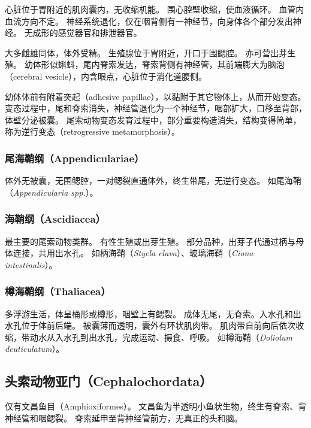 \documentclass[11pt]{article}
\begin{document}
\newline

心脏位于胃附近的肌肉囊内，无收缩机能。
围心腔壁收缩，使血液循环。
血管内血流方向不定。
神经系统退化，仅在咽背侧有一神经节，向身体各个部分发出神经。
无成形的感觉器官和排泄器官。

\newline

大多雌雄同体，体外受精。
生殖腺位于胃附近，开口于围鳃腔。
亦可营出芽生殖。
幼体形似蝌蚪，尾内脊索发达，脊索背侧有神经管，其前端膨大为脑泡（cerebral vesicle），内含眼点，心脏位于消化道腹侧。

\newline

幼体体前有附着突起（adhesive papillae），以黏附于其它物体上，从而开始变态。
变态过程中，尾和脊索消失，神经管退化为一个神经节，咽部扩大，口移至背部，体壁分泌被囊。
尾索动物变态发育过程中，部分重要构造消失，结构变得简单，称为逆行变态（retrogressive metamorphosis）。

\subsubsection{尾海鞘纲（Appendiculariae）}
体外无被囊，无围鳃腔，一对鳃裂直通体外，终生带尾，无逆行变态。
如尾海鞘（\textit{Appendicularia spp.}）。

\subsubsection{海鞘纲（Ascidiacea）}
最主要的尾索动物类群。
有性生殖或出芽生殖。
部分品种，出芽子代通过柄与母体连接，共用出水孔。
如柄海鞘（\textit{Styela clava}）、玻璃海鞘（\textit{Ciona intestinalis}）。

\subsubsection{樽海鞘纲（Thaliacea）}
多浮游生活，体呈桶形或樽形，咽壁上有鳃裂。
成体无尾，无脊索。入水孔和出水孔位于体前后端。
被囊薄而透明，囊外有环状肌肉带。
肌肉带自前向后依次收缩，带动水从入水孔到出水孔，完成运动、摄食、呼吸。
如樽海鞘（\textit{Doliolum deuticulatum}）。

\subsection{头索动物亚门（Cephalochordata）}
仅有文昌鱼目（Amphioxiformes）。
文昌鱼为半透明小鱼状生物，终生有脊索、背神经管和咽鳃裂。
脊索延申至背神经管前方，无真正的头和脑。
\end{document}
